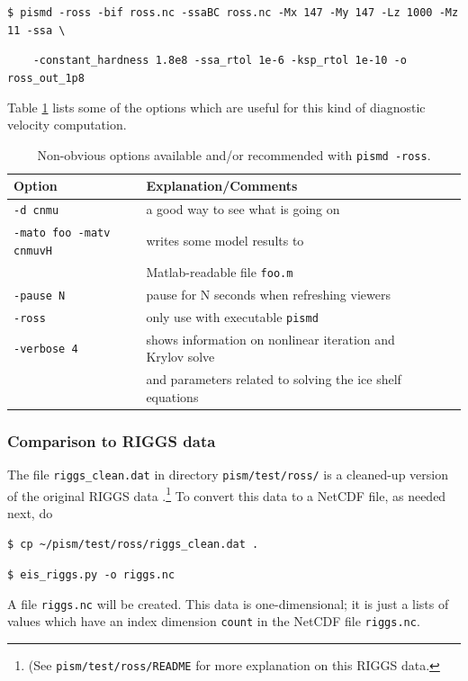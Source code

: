 \documentclass[11pt,final]{amsart}
\begin{document}
\verb|$ pismd -ross -bif ross.nc -ssaBC ross.nc -Mx 147 -My 147 -Lz 1000 -Mz 11 -ssa \|

\verb|    -constant_hardness 1.8e8 -ssa_rtol 1e-6 -ksp_rtol 1e-10 -o ross_out_1p8|

\noindent Table \ref{tab:rossoptions} lists some of the options which are useful for this kind of diagnostic velocity computation.

\small
\begin{table}[ht]
\caption{Non-obvious options available and/or recommended with \texttt{pismd -ross}.}\label{tab:rossoptions}
\begin{tabular}{@{}llll}\hline
\textbf{Option} & \textbf{Explanation/Comments} \\ \hline
  \verb|-d cnmu| &       a good way to see what is going on \\
  \verb|-mato foo -matv cnmuvH| &  writes some model results to \\
    & Matlab-readable file \verb|foo.m| \\
  \verb|-pause N| &      pause for N seconds when refreshing viewers \\
  \verb|-ross| &         only use with executable \verb|pismd| \\
  \verb|-verbose 4| &      shows information on nonlinear iteration and Krylov solve \\
    & and parameters related to solving the ice shelf equations \\
\hline
\end{tabular}
\end{table}
\normalsize


\subsubsection*{Comparison to RIGGS data}  The file \verb|riggs_clean.dat| in directory \verb|pism/test/ross/| is a cleaned-up version of the original RIGGS data \cite{RIGGS1, RIGGS2}.\footnote{(See \texttt{pism/test/ross/README} for more explanation on this RIGGS data.}  To convert this data to a NetCDF file, as needed next, do

\verb|$ cp ~/pism/test/ross/riggs_clean.dat .|

\verb|$ eis_riggs.py -o riggs.nc|

\noindent A file \verb|riggs.nc| will be created.  This data is one-dimensional; it is just a lists of values which have an index dimension \verb|count| in the NetCDF file \verb|riggs.nc|.
\end{document}
